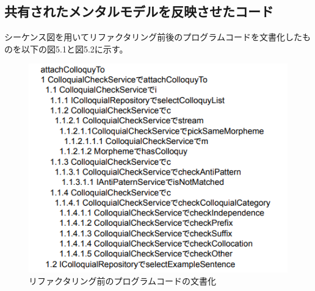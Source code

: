 \documentclass[11pt, a4paper]{jreport}
\begin{document}
\subsection{共有されたメンタルモデルを反映させたコード}
シーケンス図を用いてリファクタリング前後のプログラムコードを文書化したものを以下の図5.1と図5.2に示す。
\begin{figure}[H]
\centering
\includegraphics[width=1\linewidth]{image/modeiBe.png}
\caption{リファクタリング前のプログラムコードの文書化}
\label{fig:enter-label}
\end{figure}
\end{document}

